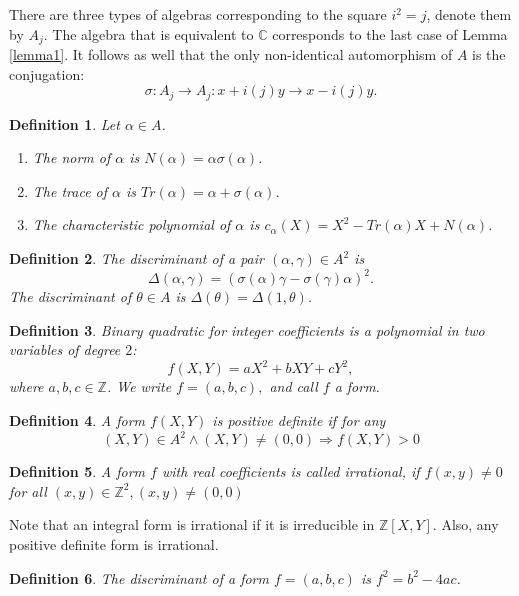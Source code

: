 \documentclass[12pt, letterpaper]{report}
\newtheorem{definition}{Definition}
\begin{document}
There are three types of algebras corresponding to the square $i^2 = j$, denote them by $A_{j}$. The algebra that is equivalent to $\mathbb{C}$ corresponds to the last case of
Lemma \ref{lemma1}. It follows as well that the only non-identical automorphism of $A$ is the conjugation:
$$
\sigma: A_{j}\longrightarrow A_{j} : x + i(j)y\longrightarrow x - i(j)y.
$$

\begin{definition}
Let $\alpha \in A$.
\begin{enumerate}
\item The norm of $\alpha$ is $N(\alpha) = \alpha\sigma(\alpha)$.
\item The trace of $\alpha$ is $Tr(\alpha) = \alpha + \sigma(\alpha)$.
\item The characteristic polynomial of $\alpha$ is $c_\alpha(X) = X^2 - Tr(\alpha)X + N(\alpha)$.
\end{enumerate}
\end{definition}
\begin{definition}
The discriminant of a pair $(\alpha, \gamma) \in A^2$ is 
$$
\Delta(\alpha, \gamma) =(\sigma(\alpha)\gamma - \sigma(\gamma)\alpha)^2. 
$$
The discriminant of $\theta \in A$ is $\Delta(\theta) = \Delta(1, \theta)$.
\end{definition}

\begin{definition}
Binary quadratic for integer coefficients is a polynomial in two variables of degree $2$:
$$
f(X, Y) = aX^2 + bXY + cY^2,
$$
where $a, b, c\in \mathbb{Z}$. We write
$f = (a, b, c),$ and call $f$ a form.
\end{definition}

\begin{definition}
A form $f(X, Y)$ is positive definite if for any 
$$
(X, Y) \in A^{2} \land (X, Y)\not = (0,0) \Rightarrow f(X,Y) > 0
$$
\end{definition}
\begin{definition}
A form $f$ with real coefficients is called irrational, if $f (x, y) \not = 0$ 
for all $(x, y) \in\mathbb{Z}^2, (x, y) \not = (0,0)$
\end{definition}
\noindent
Note that an integral form is irrational if it is irreducible in $\mathbb{Z}[X, Y]$. 
Also, any positive definite form is irrational.

\begin{definition}
The discriminant of a form $f = (a, b, c)$ is $f^2 = b^2 - 4ac$.
\end{definition}
\noindent
\end{document}
